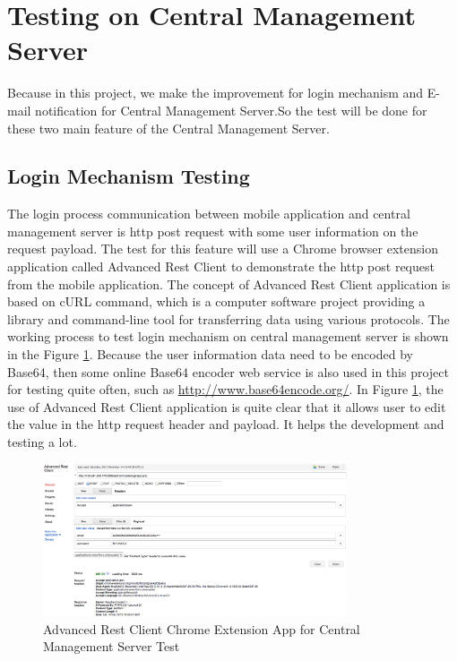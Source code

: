 \section{Testing on Central Management Server}
\par Because in this project, we make the improvement for login mechanism and E-mail notification for Central Management Server.So the test will be done for these two main feature of the Central Management Server.

\subsection{Login Mechanism Testing}
\par The login process communication between mobile application and central management server is \gls{http} post request with some user information on the request payload. The test for this feature will use a Chrome browser extension application called Advanced Rest Client to demonstrate the \gls{http} post request from the mobile application. The concept of Advanced Rest Client application is based on cURL\cite{curl} command, which is a computer software project providing a library and command-line tool for transferring data using various protocols. The working process to test login mechanism on central management server is shown in the Figure \ref{fig:restclient_test}. Because the user information data need to be encoded by Base64, then some online Base64 encoder web service is also used in this project for testing quite often, such as \url{http://www.base64encode.org/}. In Figure \ref{fig:restclient_test}, the use of Advanced Rest Client application is quite clear that it allows user to edit the value in the \gls{http} request header and payload. It helps the development and testing a lot.
\begin{figure}
	\centering
    	\includegraphics[width=0.80\textwidth,natwidth=610,natheight=642]{figs/restclient_test.png}
  	\caption{Advanced Rest Client Chrome Extension App for Central Management Server Test}
  	\label{fig:restclient_test}
\end{figure}

